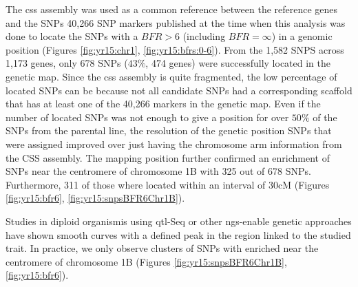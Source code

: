 The \acrshort{css} assembly was used as a common reference between the reference genes and the SNPs  40,266 SNP markers published at the time when this analysis was done \citep{Wang2014} to locate the SNPs with a $BFR>6$ (including $BFR=\infty$) in a genomic position (Figures \ref{fig:yr15:chr1}, \ref{fig:yr15:bfrs:0-6}).  
From the 1,582 SNPS across 1,173 genes,  only 678 SNPs ($43\%$, 474 genes) were successfully located in the genetic map. 
Since the \acrshort{css} assembly is quite fragmented, the low percentage of located SNPs can be because not all candidate SNPs had a corresponding scaffold that has at least one of the 40,266 markers in the genetic map. 
Even if the number of located SNPs was not enough to give a position for over $50\%$ of the SNPs from the parental line, the resolution of the genetic position SNPs that were assigned improved over just having the chromosome arm information from the CSS assembly. 
The mapping position further confirmed an enrichment of SNPs near the centromere of chromosome 1B with 325 out of 678 SNPs. 
Furthermore, 311 of those where located within an interval of 30cM (Figures \ref{fig:yr15:bfr6}, \ref{fig:yr15:snpsBFR6Chr1B}). 

Studies in diploid organismis using \acrshort{qtl}-Seq \citep{Takagi2013} or other \acrshort{ngs}-enable genetic approaches \citep{James2013} have shown smooth curves with a defined peak in the region linked to the studied trait. 
In practice, we only observe clusters of SNPs with  enriched  near the centromere of chromosome 1B (Figures \ref{fig:yr15:snpsBFR6Chr1B}, \ref{fig:yr15:bfr6}). 

